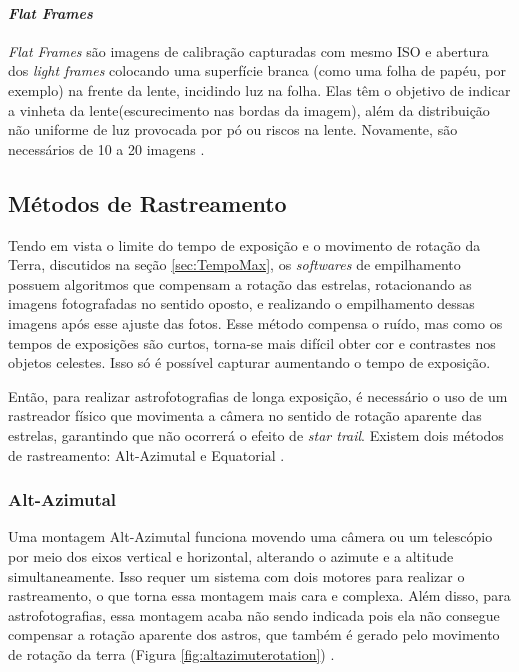 \paragraph{\textit{Flat Frames}}
\textit{Flat Frames} são imagens de calibração capturadas com mesmo ISO e abertura dos \textit{light frames} colocando uma superfície branca (como uma folha de papéu, por exemplo) na frente da lente, incidindo luz na folha. Elas têm o objetivo de indicar a vinheta da lente(escurecimento nas bordas da imagem), além da distribuição não uniforme de luz provocada por pó ou riscos na lente. Novamente, são necessários de 10 a 20 imagens
\cite{man:deepskystackerfaq}.


\subsection{Métodos de Rastreamento}

Tendo em vista o limite do tempo de exposição e o movimento de rotação da Terra, discutidos na seção \ref{sec:TempoMax}, os \textit{softwares} de empilhamento possuem algoritmos que compensam a rotação das estrelas, rotacionando as imagens fotografadas no sentido oposto, e realizando o empilhamento dessas imagens após esse ajuste das fotos. Esse método compensa o ruído, mas como os tempos de exposições são curtos, torna-se mais difícil obter cor e contrastes nos objetos celestes. Isso só é possível capturar aumentando o tempo de exposição. 

Então, para realizar astrofotografias de longa exposição, é necessário o uso de um rastreador físico que movimenta a câmera no sentido de rotação aparente das estrelas, garantindo que não ocorrerá o efeito de \textit{star trail}. Existem dois métodos de rastreamento: Alt-Azimutal e Equatorial \cite{book:bbcsky}.

\subsubsection{Alt-Azimutal}

Uma montagem Alt-Azimutal funciona movendo uma câmera ou um telescópio por meio dos eixos vertical e horizontal, alterando o azimute e a altitude simultaneamente. Isso requer um sistema com dois motores para realizar o rastreamento, o que torna essa montagem mais cara e complexa. Além disso, para astrofotografias, essa montagem acaba não sendo indicada pois ela não consegue compensar a rotação aparente dos astros, que também é gerado pelo movimento de rotação da terra (Figura \ref{fig:altazimuterotation}) \cite{book:bbcsky}. 

